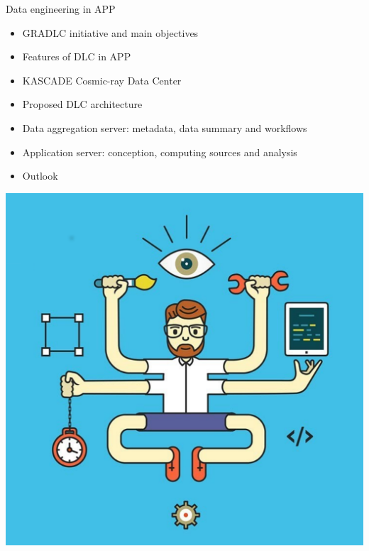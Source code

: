 \begin{frame}{Data engineering in APP}

\begin{minipage}[c]{0.52\textwidth}
  \begin{itemize}
      \setlength{\itemsep}{0pt}
      \item  GRADLC initiative and main objectives
      \item  Features of DLC in APP
      \item  KASCADE Cosmic-ray Data Center
      \item  Proposed DLC architecture
      \item  Data aggregation server: metadata, data summary and workflows
      \item   Application server: conception, computing sources and analysis
      \item  Outlook
  \end{itemize}
\end{minipage}
\hfill
\begin{minipage}[c]{0.47\textwidth}
  \includegraphics[width=1\textwidth]{pics/DE_fun.pdf}
\end{minipage}
\end{frame}


